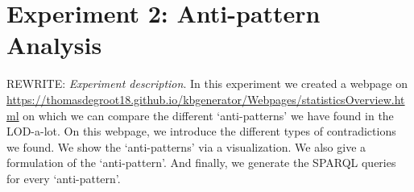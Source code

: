 \documentclass[11pt,letterpaper ,oneside ]{book}
\begin{document}
	\section{Experiment 2: Anti-pattern Analysis} %
	REWRITE:
	\textit{Experiment description}. In this experiment we created a webpage on\\ \url{https://thomasdegroot18.github.io/kbgenerator/Webpages/statisticsOverview.html} on which we can compare the different `anti-patterns' we have found in the LOD-a-lot. On this webpage, we introduce the different types of contradictions we found. We show the `anti-patterns' via a visualization. We also give a formulation of the `anti-pattern'. And finally, we generate the SPARQL queries for every `anti-pattern'.  
	
	\begin{figure}[!t]
	\end{figure}
	
\end{document}
